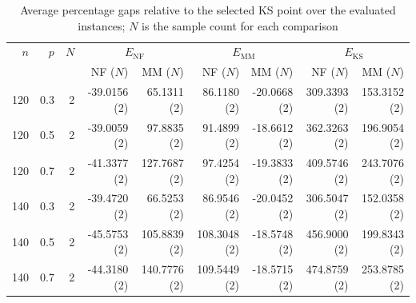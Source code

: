 \begin{table}[ht!]
\centering
\caption{Average percentage gaps relative to the selected KS point over the evaluated instances; $N$ is the sample count for each comparison}
\begin{tabular}{rrr rrr rrr}
\toprule
$n$ & $p$ & $N$ & \multicolumn{2}{c}{$E_{\mathrm{NF}}$} & \multicolumn{2}{c}{$E_{\mathrm{MM}}$} & \multicolumn{2}{c}{$E_{\mathrm{KS}}$} \\
 & & & NF ($N$) & MM ($N$) & NF ($N$) & MM ($N$) & NF ($N$) & MM ($N$) \\
\midrule
120 & 0.3 & 2 & -39.0156 (2) & 65.1311 (2) & 86.1180 (2) & -20.0668 (2) & 309.3393 (2) & 153.3152 (2) \\
120 & 0.5 & 2 & -39.0059 (2) & 97.8835 (2) & 91.4899 (2) & -18.6612 (2) & 362.3263 (2) & 196.9054 (2) \\
120 & 0.7 & 2 & -41.3377 (2) & 127.7687 (2) & 97.4254 (2) & -19.3833 (2) & 409.5746 (2) & 243.7076 (2) \\
140 & 0.3 & 2 & -39.4720 (2) & 66.5253 (2) & 86.9546 (2) & -20.0452 (2) & 306.5047 (2) & 152.0358 (2) \\
140 & 0.5 & 2 & -45.5753 (2) & 105.8839 (2) & 108.3048 (2) & -18.5748 (2) & 456.9000 (2) & 199.8343 (2) \\
140 & 0.7 & 2 & -44.3180 (2) & 140.7776 (2) & 109.5449 (2) & -18.5715 (2) & 474.8759 (2) & 253.8785 (2) \\
\bottomrule
\end{tabular}
\end{table}
